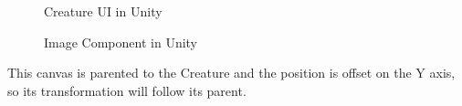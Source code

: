 \documentclass[12pt]{report}
\begin{document}
\begin{figure}[H]
    \begin{minipage}{.5\textwidth}
        \centering
        \caption{Creature UI in Unity}
    \end{minipage}
    \begin{minipage}{.5\textwidth}
        \centering
        \caption{Image Component in Unity}
    \end{minipage}
\end{figure}

This canvas is parented to the Creature and the position is offset on the Y axis, so its transformation will follow its parent.
\end{document}

